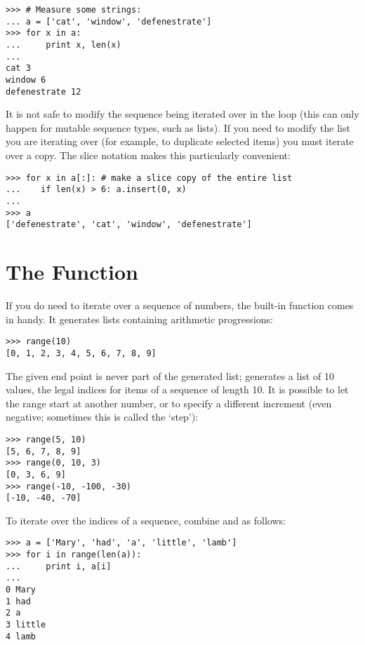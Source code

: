 \documentclass{manual}
\begin{document}
\begin{verbatim}
>>> # Measure some strings:
... a = ['cat', 'window', 'defenestrate']
>>> for x in a:
...     print x, len(x)
... 
cat 3
window 6
defenestrate 12
\end{verbatim}

It is not safe to modify the sequence being iterated over in the loop
(this can only happen for mutable sequence types, such as lists).  If
you need to modify the list you are iterating over (for example, to
duplicate selected items) you must iterate over a copy.  The slice
notation makes this particularly convenient:

\begin{verbatim}
>>> for x in a[:]: # make a slice copy of the entire list
...    if len(x) > 6: a.insert(0, x)
... 
>>> a
['defenestrate', 'cat', 'window', 'defenestrate']
\end{verbatim}


\section{The  Function \label{range}}

If you do need to iterate over a sequence of numbers, the built-in
function  comes in handy.  It generates lists
containing arithmetic progressions:

\begin{verbatim}
>>> range(10)
[0, 1, 2, 3, 4, 5, 6, 7, 8, 9]
\end{verbatim}

The given end point is never part of the generated list;
 generates a list of 10 values, the legal
indices for items of a sequence of length 10.  It is possible to let
the range start at another number, or to specify a different increment
(even negative; sometimes this is called the `step'):

\begin{verbatim}
>>> range(5, 10)
[5, 6, 7, 8, 9]
>>> range(0, 10, 3)
[0, 3, 6, 9]
>>> range(-10, -100, -30)
[-10, -40, -70]
\end{verbatim}

To iterate over the indices of a sequence, combine
 and  as follows:

\begin{verbatim}
>>> a = ['Mary', 'had', 'a', 'little', 'lamb']
>>> for i in range(len(a)):
...     print i, a[i]
... 
0 Mary
1 had
2 a
3 little
4 lamb
\end{verbatim}
\end{document}
